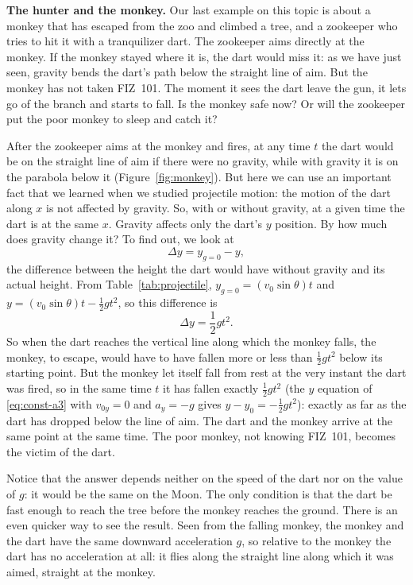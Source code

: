 \documentclass[11pt,a4paper]{article}
\begin{document}
\textbf{The hunter and the monkey.} Our last example on this topic is about a monkey that has
escaped from the zoo and climbed a tree, and a zookeeper who tries to hit it with a tranquilizer
dart. The zookeeper aims directly at the monkey. If the monkey stayed where it is, the dart would
miss it: as we have just seen, gravity bends the dart's path below the straight line of aim. But
the monkey has not taken FIZ~101. The moment it sees the dart leave the gun, it lets go of the
branch and starts to fall. Is the monkey safe now? Or will the zookeeper put the poor monkey to
sleep and catch it?

After the zookeeper aims at the monkey and fires, at any time $t$ the dart would be on the straight
line of aim if there were no gravity, while with gravity it is on the parabola below it
(Figure~\ref{fig:monkey}). But here we can use an important fact that we learned when we studied
projectile motion: the motion of the dart along $x$ is not affected by gravity. So, with or without
gravity, at a given time the dart is at the same $x$. Gravity affects only the dart's $y$ position.
By how much does gravity change it? To find out, we look at
\begin{equation}\label{eq:dy-def}
  \Delta y = y_{g=0} - y ,
\end{equation}
the difference between the height the dart would have without gravity and its actual height. From
Table~\ref{tab:projectile}, $y_{g=0} = (v_0\sin\theta)t$ and $y = (v_0\sin\theta)t - \frac12 gt^2$,
so this difference is
\begin{equation}\label{eq:dy}
  \Delta y = \frac12 gt^2 .
\end{equation}
So when the dart reaches the vertical line along which the monkey falls, the monkey, to escape,
would have to have fallen more or less than $\frac12 gt^2$ below its starting point. But the monkey
let itself fall from rest at the very instant the dart was fired, so in the same time $t$ it has
fallen exactly $\frac12 gt^2$ (the $y$ equation of \eqref{eq:const-a3} with $v_{0y} = 0$ and
$a_y = -g$ gives $y - y_0 = -\frac12 gt^2$): exactly as far as
the dart has dropped below the line of aim. The dart and the monkey arrive at the same point at the
same time. The poor monkey, not knowing FIZ~101, becomes the victim of the dart.

Notice that the answer depends neither on the speed of the dart nor on the value of $g$: it would
be the same on the Moon. The only condition is that the dart be fast enough to reach the tree
before the monkey reaches the ground. There is an even quicker way to see the result. Seen from the
falling monkey, the monkey and the dart have the same downward acceleration $g$, so relative to the
monkey the dart has no acceleration at all: it flies along the straight line along which it was
aimed, straight at the monkey.
\end{document}
